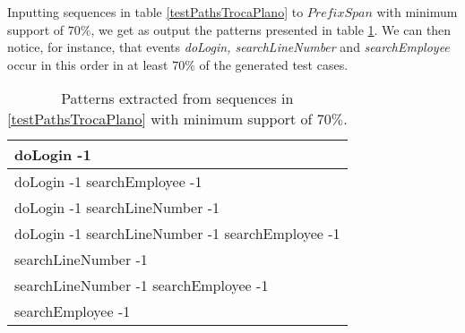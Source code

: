 Inputting sequences in table \ref{testPathsTrocaPlano} to $PrefixSpan$ with minimum support of $70\%$, we get as output the patterns presented in table \ref{patternsTrocaPlano}. We can then notice, for instance, that events \textit{doLogin, searchLineNumber} and \textit{searchEmployee} occur in this order in at least $70\%$ of the generated test cases.

\begin{table}[h]
\begin{center}
\begin{tabular}{|l|}

\hline

doLogin -1  \\ \hline
doLogin -1 searchEmployee -1 \\ \hline
doLogin -1 searchLineNumber -1  \\ \hline
doLogin -1 searchLineNumber -1 searchEmployee -1  \\ \hline
searchLineNumber -1  \\ \hline
searchLineNumber -1 searchEmployee -1  \\ \hline
searchEmployee -1 \\

\hline
\end{tabular}
\end{center}
\caption{Patterns extracted from sequences in \ref{testPathsTrocaPlano} with minimum support of $70\%$.}
\label{patternsTrocaPlano}
\end{table}

